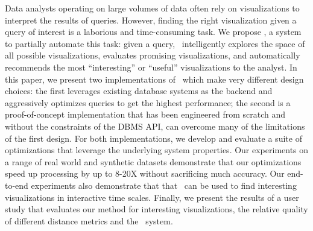 

Data analysts operating on large volumes of data often rely on visualizations to
interpret the results of queries.
However, finding the right visualization given a query of interest is a
laborious and time-consuming task.
We propose \VizRecDB, a system to partially automate this task:
given a query, \VizRecDB\ intelligently explores the space of all possible
visualizations, evaluates promising visualizations, and automatically recommends
the most ``interesting'' or ``useful'' visualizations to the analyst.
In this paper, we present two implementations of \VizRecDB\ which make very
different design choices: the first leverages existing database systems as the
backend and aggressively optimizes queries to get the highest performance; the
second is a proof-of-concept implementation that has been engineered from scratch and
without the constraints of the DBMS API, can overcome many of the limitations of
the first design.
For both implementations, we develop and evaluate a suite of optimizations that
leverage the underlying system properties.
Our experiments  on a range of real world and synthetic datasets demonstrate
that our optimizations speed up processing by up to 8-20X without sacrificing
much accuracy.
Our end-to-end experiments also demonstrate that that \VizRecDB\ can be used to
find interesting visualizations in interactive time scales.
Finally, we present the results of a user study that evaluates our method for
interesting visualizations, the relative quality of different distance metrics
and the \VizRecDB\ system.
